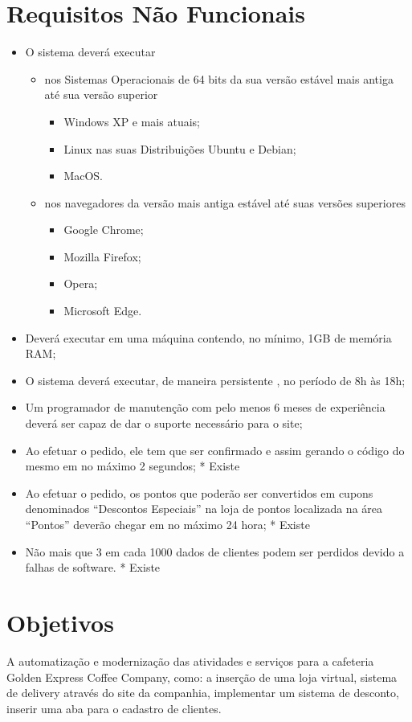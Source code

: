 \section{Requisitos Não Funcionais}
\begin{itemize}
	\item O sistema deverá executar
		\begin{itemize}
			\item nos Sistemas Operacionais de 64 bits da sua versão estável mais antiga até sua versão superior
				\begin{itemize}
					\item Windows XP e mais atuais;
					\item Linux nas suas Distribuições Ubuntu e Debian;
					\item MacOS.
				\end{itemize}
			\item nos navegadores da versão mais antiga estável até suas versões superiores
				\begin{itemize}
					\item Google Chrome;
					\item Mozilla Firefox;
					\item Opera;
					\item Microsoft Edge.
				\end{itemize}
		\end{itemize}
	\item Deverá executar em uma máquina contendo, no mínimo, 1GB de memória RAM;
	\item O sistema deverá executar, de maneira persistente , no período de 8h às 18h;
	\item Um programador de manutenção com pelo menos 6 meses de
	experiência deverá ser capaz de dar o suporte necessário para o site;
	\item Ao efetuar o pedido, ele tem que ser confirmado e assim gerando
	o código do mesmo em no máximo 2 segundos; * Existe
	\item Ao efetuar o pedido, os pontos que poderão ser convertidos em cupons denominados
	“Descontos Especiais” na loja de pontos localizada na área “Pontos” deverão chegar em no máximo 24 hora; * Existe
	\item Não mais que 3 em cada 1000 dados de clientes podem ser perdidos
	devido a falhas de software. * Existe
\end{itemize}

\section{Objetivos}
A automatização e modernização das atividades e serviços para a cafeteria Golden Express Coffee Company, como: a inserção de uma loja virtual, sistema de delivery através do site da companhia, implementar um sistema de desconto, inserir uma aba para o cadastro de clientes.

